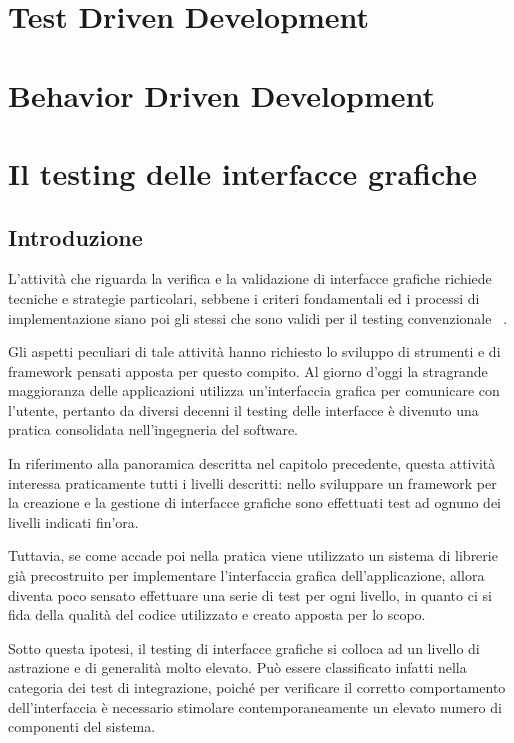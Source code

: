 \section{Test Driven Development}

\section{Behavior Driven Development}

\section{Il testing delle interfacce grafiche}

\subsection{Introduzione}

L'attività che riguarda la verifica e la validazione di interfacce grafiche richiede tecniche e strategie particolari, sebbene i criteri fondamentali ed i processi di implementazione siano poi gli stessi che sono validi per il testing convenzionale ~\cite{memonGuiTesting}.

Gli aspetti peculiari di tale attività hanno richiesto lo sviluppo di strumenti e di framework pensati apposta per questo compito. Al giorno d'oggi la stragrande maggioranza delle applicazioni utilizza un'interfaccia grafica per comunicare con l'utente, pertanto da diversi decenni il testing delle interfacce è divenuto una pratica consolidata nell'ingegneria del software.

In riferimento alla panoramica descritta nel capitolo precedente, questa attività interessa praticamente tutti i livelli descritti: nello sviluppare un framework per la creazione e la gestione di interfacce grafiche sono effettuati test ad ognuno dei livelli indicati fin'ora.

Tuttavia, se come accade poi nella pratica viene utilizzato un sistema di librerie già precostruito per implementare l'interfaccia grafica dell'applicazione, allora diventa poco sensato effettuare una serie di test per ogni livello, in quanto ci si fida della qualità del codice utilizzato e creato apposta per lo scopo.

Sotto questa ipotesi, il testing di interfacce grafiche si colloca ad un livello di astrazione e di generalità molto elevato. Può essere classificato infatti nella categoria dei test di integrazione, poiché per verificare il corretto comportamento dell'interfaccia è necessario stimolare contemporaneamente un elevato numero di componenti del sistema. 

